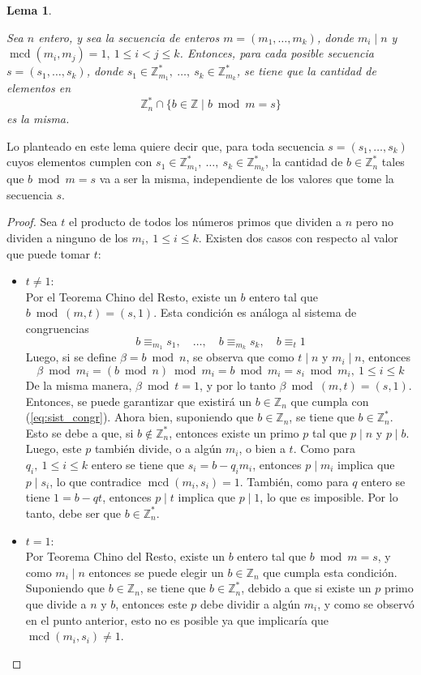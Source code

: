 \documentclass[hidelinks, 12pt]{article}
\newcommand{\Z}{\mathbb{Z}}
\newcommand{\Zs}{\mathbb{Z}^*}
\DeclareMathOperator{\mcd}{mcd}
\newtheorem{lemma}{Lema}[section]
\begin{document}
\begin{lemma}
\label{le:4.1}
    Sea $n$ entero, y sea la secuencia de enteros $m=(m_1,\dots,m_k)$, donde $m_i\mid n$ y $\mcd(m_i,m_j)=1,~1\leq i<j\leq k$. Entonces, para cada posible secuencia $s=(s_1,\dots,s_k)$, donde $s_1\in\Zs_{m_1},~\dots,~s_k\in\Zs_{m_k}$, se tiene que la cantidad de elementos en \[\Zs_n\cap \{b\in\Z\mid b\bmod m=s\}\] es la misma.
\end{lemma}

Lo planteado en este lema quiere decir que, para toda secuencia $s=(s_1,\dots,s_k)$ cuyos elementos cumplen con $s_1\in\Zs_{m_1},~\dots,~s_k\in\Zs_{m_k}$, la cantidad de $b\in\Zs_n$ tales que $b\bmod m=s$ va a ser la misma, independiente de los valores que tome la secuencia $s$.
\begin{proof}
    Sea $t$ el producto de todos los números primos que dividen a $n$ pero no dividen a ninguno de los $m_i,~1\leq i\leq k$. Existen dos casos con respecto al valor que puede tomar $t$:
    \begin{itemize}
        \item $t\neq 1$: \\
        Por el Teorema Chino del Resto, existe un $b$ entero tal que $b\bmod(m,t)=(s,1)$. Esta condición es análoga al sistema de congruencias
        \begin{equation}
            b\equiv_{m_1}s_1,\quad\dots,\quad b\equiv_{m_k}s_k,\quad b\equiv_t 1
            \label{eq:sist_congr}
        \end{equation}
        Luego, si se define $\beta=b\bmod n$, se observa que como $t\mid n$ y $m_i\mid n$, entonces 
        \[\beta\bmod m_i=(b\bmod n)\bmod m_i=b\bmod m_i=s_i\bmod m_i,~1\leq i\leq k\]
        De la misma manera, $\beta\bmod t=1$, y por lo tanto $\beta\bmod(m,t)=(s,1)$. Entonces, se puede garantizar que existirá un $b\in\Z_n$ que cumpla con (\ref{eq:sist_congr}). Ahora bien, suponiendo que $b\in\Z_n$, se tiene que $b\in\Zs_n$. Esto se debe a que, si $b\not\in\Zs_n$, entonces existe un primo $p$ tal que $p\mid n$ y $p\mid b$. Luego, este $p$ también divide, o a algún $m_i$, o bien a $t$. Como  para $q_i,~1\leq i \leq k$ entero se tiene que $s_i=b-q_im_i$, entonces $p\mid m_i$ implica que $p\mid s_i$, lo que contradice $\mcd(m_i,s_i)=1$. También, como para $q$ entero se tiene $1=b-qt$, entonces $p\mid t$ implica que $p\mid 1$, lo que es imposible. Por lo tanto, debe ser que $b\in\Zs_n$.

        \item $t=1$: \\
        Por Teorema Chino del Resto, existe un $b$ entero tal que $b\bmod m=s$, y como $m_i\mid n$ entonces se puede elegir un $b\in\Z_n$ que cumpla esta condición. Suponiendo que $b\in\Z_n$, se tiene que $b\in\Zs_n$, debido a que si existe un $p$ primo que divide a $n$ y $b$, entonces este $p$ debe dividir a algún $m_i$, y como se observó en el punto anterior, esto no es posible ya que implicaría que $\mcd(m_i,s_i)\neq 1$.
    \end{itemize}


\end{proof}
\end{document}

